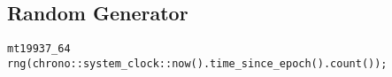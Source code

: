\subsection{Random Generator}
\begin{lstlisting}
mt19937_64 rng(chrono::system_clock::now().time_since_epoch().count());
\end{lstlisting}